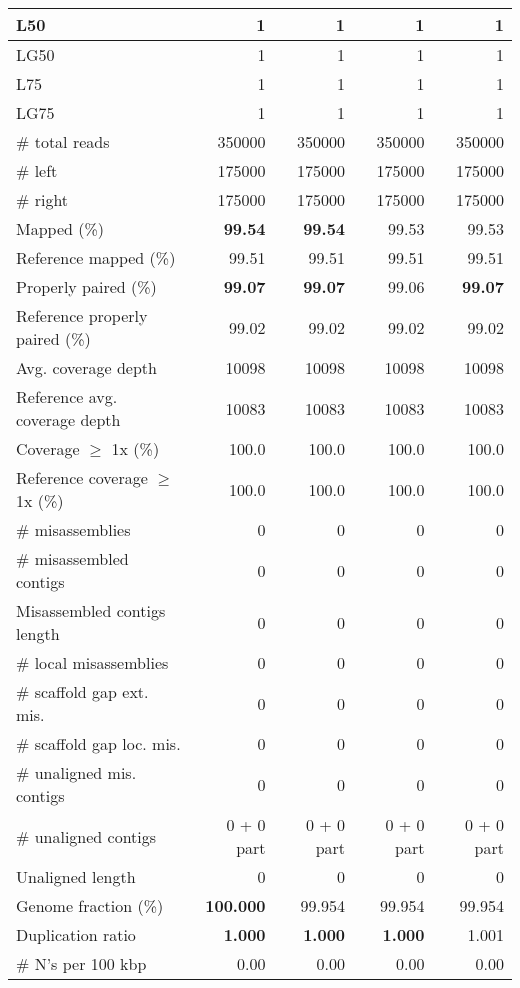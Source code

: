 \documentclass[12pt,a4paper]{article}
\begin{document}
\begin{table}[ht]
\begin{center}
\begin{tabular}{|l*{4}{|r}|}
L50 & 1 & 1 & 1 & 1 \\ \hline
LG50 & 1 & 1 & 1 & 1 \\ \hline
L75 & 1 & 1 & 1 & 1 \\ \hline
LG75 & 1 & 1 & 1 & 1 \\ \hline
\# total reads & 350000 & 350000 & 350000 & 350000 \\ \hline
\# left & 175000 & 175000 & 175000 & 175000 \\ \hline
\# right & 175000 & 175000 & 175000 & 175000 \\ \hline
Mapped (\%) & {\bf 99.54} & {\bf 99.54} & 99.53 & 99.53 \\ \hline
Reference mapped (\%) & 99.51 & 99.51 & 99.51 & 99.51 \\ \hline
Properly paired (\%) & {\bf 99.07} & {\bf 99.07} & 99.06 & {\bf 99.07} \\ \hline
Reference properly paired (\%) & 99.02 & 99.02 & 99.02 & 99.02 \\ \hline
Avg. coverage depth & 10098 & 10098 & 10098 & 10098 \\ \hline
Reference avg. coverage depth & 10083 & 10083 & 10083 & 10083 \\ \hline
Coverage $\geq$ 1x (\%) & 100.0 & 100.0 & 100.0 & 100.0 \\ \hline
Reference coverage $\geq$ 1x (\%) & 100.0 & 100.0 & 100.0 & 100.0 \\ \hline
\# misassemblies & 0 & 0 & 0 & 0 \\ \hline
\# misassembled contigs & 0 & 0 & 0 & 0 \\ \hline
Misassembled contigs length & 0 & 0 & 0 & 0 \\ \hline
\# local misassemblies & 0 & 0 & 0 & 0 \\ \hline
\# scaffold gap ext. mis. & 0 & 0 & 0 & 0 \\ \hline
\# scaffold gap loc. mis. & 0 & 0 & 0 & 0 \\ \hline
\# unaligned mis. contigs & 0 & 0 & 0 & 0 \\ \hline
\# unaligned contigs & 0 + 0 part & 0 + 0 part & 0 + 0 part & 0 + 0 part \\ \hline
Unaligned length & 0 & 0 & 0 & 0 \\ \hline
Genome fraction (\%) & {\bf 100.000} & 99.954 & 99.954 & 99.954 \\ \hline
Duplication ratio & {\bf 1.000} & {\bf 1.000} & {\bf 1.000} & 1.001 \\ \hline
\# N's per 100 kbp & 0.00 & 0.00 & 0.00 & 0.00 \\ \hline

\end{tabular}
\end{center}
\end{table}
\end{document}
